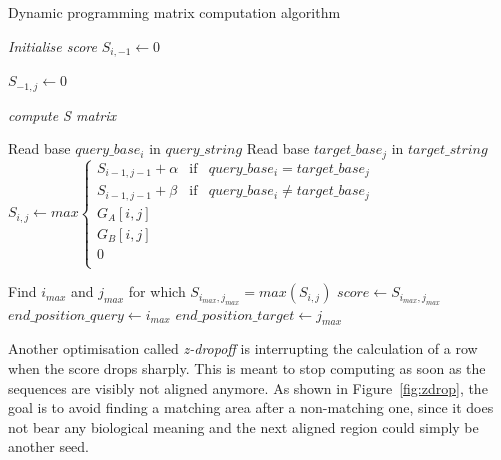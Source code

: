  \begin{algorithm}[h!]
 	\caption{Dynamic programming matrix computation algorithm}
 	\label{algo:local}
 	\begin{algorithmic}[1] %
 		 \Comment{}
		

 		\State \emph{Initialise score}
 			\State $S_{i, -1} \leftarrow 0$
 		\EndFor	
				
 			\State $S_{-1, j} \leftarrow 0$	
 		\EndFor

 		\State \emph{compute S matrix}

 				\State Read base $query\_base_i$ in $query\_string$
 				\State Read base $target\_base_j$ in $target\_string$ 	
 				\State $ 	S_{i,j} \leftarrow max \left\{
 				\begin{array}{llll}
 				S_{i-1, j-1} + \alpha & \mbox{if} & query\_base_i = target\_base_j \\
 				S_{i-1, j-1} + \beta & \mbox{if} & query\_base_i \neq target\_base_j \\
 		 		G_{A}[i,j] \\
 		        G_{B}[i,j]\\
 				0 \\
 				\end{array}
 				\right. $
				
 			\EndFor
			
 		\EndFor
		
 		\State Find $i_{max}$ and $j_{max}$ for which $S_{i_{max}, j_{max}} = max(S_{i,j})$
 		\State $score \leftarrow S_{i_{max}, j_{max}}$
 		\State $end\_position\_query \leftarrow i_{max}$
 		\State $end\_position\_target \leftarrow j_{max}$
	
 		\EndProcedure
		
	\end{algorithmic}
\end{algorithm}

Another optimisation called \emph{z-dropoff} is interrupting the calculation of a row when the score drops sharply. This is meant to stop computing as soon as the sequences are visibly not aligned anymore. As shown in Figure~\ref{fig:zdrop}, the goal is to avoid finding a matching area after a non-matching one, since it does not bear any biological meaning and the next aligned region could simply be another seed.

